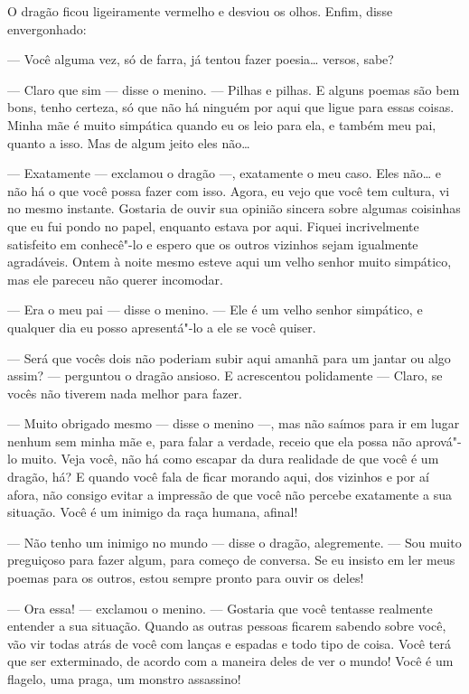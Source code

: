 O dragão ficou ligeiramente vermelho e desviou os olhos. Enfim, disse
envergonhado:

--- Você alguma vez, só de farra, já tentou fazer poesia\ldots{} versos, sabe?

--- Claro que sim --- disse o menino. --- Pilhas e pilhas. E alguns poemas
são bem bons, tenho certeza, só que não há ninguém por aqui que ligue
para essas coisas. Minha mãe é muito simpática quando eu
os leio para ela, e também meu pai, quanto a isso. Mas de algum jeito
eles não\ldots{}

--- Exatamente --- exclamou o dragão ---, exatamente o meu caso. Eles não\ldots{} e
não há o que você possa fazer com isso. Agora, eu vejo que você tem
cultura, vi no mesmo instante. Gostaria de ouvir sua opinião
sincera sobre algumas coisinhas que eu fui pondo no papel, enquanto
estava por aqui. Fiquei incrivelmente satisfeito em conhecê"-lo e
espero que os outros vizinhos sejam igualmente agradáveis. Ontem à
noite mesmo esteve aqui um velho senhor muito simpático, mas ele
pareceu não querer incomodar.

--- Era o meu pai --- disse o menino. --- Ele é um velho senhor simpático, e
qualquer dia eu posso apresentá"-lo a ele se você quiser.

--- Será que vocês dois não poderiam subir aqui amanhã para um jantar ou
algo assim? --- perguntou o dragão ansioso. E acrescentou
polidamente --- Claro, se vocês não tiverem nada melhor para fazer. 

--- Muito obrigado mesmo --- disse o menino ---, mas não saímos para ir em
lugar nenhum sem minha mãe e, para falar a verdade, receio que ela
possa não aprová"-lo muito. Veja você, não há como escapar da dura
realidade de que você é um dragão, há? E quando você fala de ficar
morando aqui, dos vizinhos e por aí afora, não consigo evitar a
impressão de que você não percebe exatamente a sua situação. Você é
um inimigo da raça humana, afinal!

--- Não tenho um inimigo no mundo --- disse o dragão, alegremente. --- Sou
muito preguiçoso para fazer algum, para começo de conversa. Se eu
insisto em ler meus poemas para os outros, estou sempre pronto
para ouvir os deles!

--- Ora essa! --- exclamou o menino. --- Gostaria que você tentasse
realmente entender a sua situação. Quando as outras pessoas ficarem
sabendo sobre você, vão vir todas atrás de você com lanças e espadas
e todo tipo de coisa. Você terá que ser exterminado, de acordo com a
maneira deles de ver o mundo! Você é um flagelo, uma praga, um
monstro assassino!

